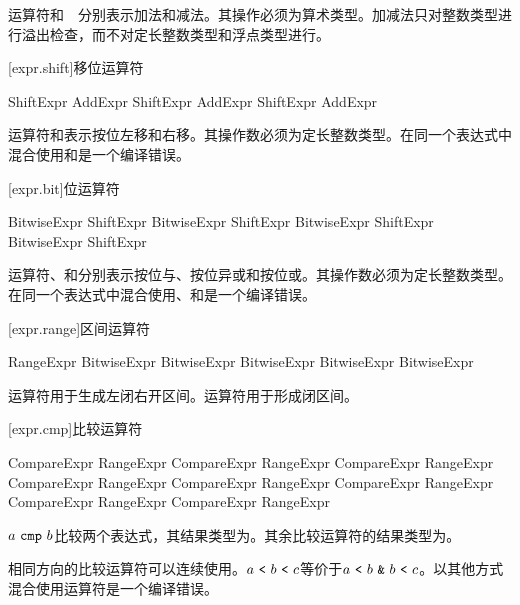\pnum
运算符\tcode{+}和\ \tcode{-}\ 分别表示加法和减法。其操作必须为算术类型。加减法只对整数类型进行溢出检查，而不对定长整数类型和浮点类型进行。

[expr.shift]{移位运算符}

\begin{bnf}{ShiftExpr}
    AddExpr \br
    ShiftExpr  AddExpr \br
    ShiftExpr  AddExpr
\end{bnf}

\pnum
运算符和表示按位左移和右移。其操作数必须为定长整数类型。在同一个表达式中混合使用和是一个编译错误。

[expr.bit]{位运算符}

\begin{bnf}{BitwiseExpr}
    ShiftExpr \br
    BitwiseExpr  ShiftExpr \br
    BitwiseExpr  ShiftExpr \br
    BitwiseExpr  ShiftExpr
\end{bnf}

\pnum
运算符、和分别表示按位与、按位异或和按位或。其操作数必须为定长整数类型。在同一个表达式中混合使用、和是一个编译错误。

[expr.range]{区间运算符}

\begin{bnf}{RangeExpr}
    BitwiseExpr \br
    BitwiseExpr  BitwiseExpr
    BitwiseExpr  BitwiseExpr
\end{bnf}

\pnum
运算符用于生成左闭右开区间。运算符用于形成闭区间。

[expr.cmp]{比较运算符}

\begin{bnf}{CompareExpr}
    RangeExpr \br
    CompareExpr \terminal{==} RangeExpr \br
    CompareExpr \terminal{!=} RangeExpr \br
    CompareExpr \terminal{<} RangeExpr \br
    CompareExpr \terminal{>} RangeExpr \br
    CompareExpr \terminal{<=} RangeExpr \br
    CompareExpr \terminal{>=} RangeExpr \br
    CompareExpr  RangeExpr
\end{bnf}

\pnum
$a\ \tcode{cmp}\ b$比较两个表达式，其结果类型为。其余比较运算符的结果类型为。

\pnum
相同方向的比较运算符可以连续使用。$a\ \tcode{<}\ b\ \tcode{<}\ c$等价于$a\ \tcode{<}\ b\ \tcode{\&}\ b\ \tcode{<}\ c$。以其他方式混合使用运算符是一个编译错误。

